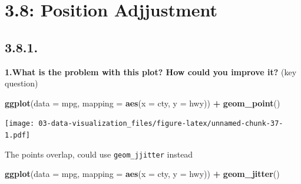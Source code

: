 \documentclass[]{book}
\newenvironment{Shaded}{\begin{snugshade}}{\end{snugshade}}
\newcommand{\DataTypeTok}[1]{\textcolor[rgb]{0.13,0.29,0.53}{#1}}
\newcommand{\KeywordTok}[1]{\textcolor[rgb]{0.13,0.29,0.53}{\textbf{#1}}}
\newcommand{\NormalTok}[1]{#1}
\newcommand{\OperatorTok}[1]{\textcolor[rgb]{0.81,0.36,0.00}{\textbf{#1}}}
\newcommand{\StringTok}[1]{\textcolor[rgb]{0.31,0.60,0.02}{#1}}
\theoremstyle{definition}
\theoremstyle{definition}
\theoremstyle{definition}
\theoremstyle{remark}
\begin{document}
\begin{Shaded}
\end{Shaded}

\hypertarget{position-adjjustment}{%
\section{3.8: Position Adjjustment}\label{position-adjjustment}}

\hypertarget{section-5}{%
\subsection{3.8.1.}\label{section-5}}

\textbf{1.What is the problem with this plot? How could you improve it?}
(key question)

\begin{Shaded}
\begin{Highlighting}[]
\KeywordTok{ggplot}\NormalTok{(}\DataTypeTok{data =}\NormalTok{ mpg, }\DataTypeTok{mapping =} \KeywordTok{aes}\NormalTok{(}\DataTypeTok{x =}\NormalTok{ cty, }\DataTypeTok{y =}\NormalTok{ hwy)) }\OperatorTok{+}\StringTok{ }
\StringTok{  }\KeywordTok{geom_point}\NormalTok{()}
\end{Highlighting}
\end{Shaded}

\texttt{[image: 03-data-visualization\_files/figure-latex/unnamed-chunk-37-1.pdf]}

The points overlap, could use \texttt{geom\_jjitter} instead

\begin{Shaded}
\begin{Highlighting}[]
\KeywordTok{ggplot}\NormalTok{(}\DataTypeTok{data =}\NormalTok{ mpg, }\DataTypeTok{mapping =} \KeywordTok{aes}\NormalTok{(}\DataTypeTok{x =}\NormalTok{ cty, }\DataTypeTok{y =}\NormalTok{ hwy)) }\OperatorTok{+}\StringTok{ }
\StringTok{  }\KeywordTok{geom_jitter}\NormalTok{()}
\end{Highlighting}
\end{Shaded}
\end{document}
